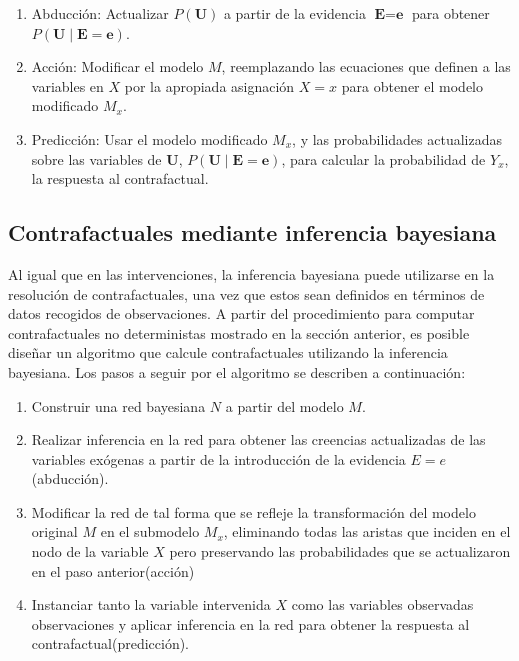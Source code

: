 \begin{enumerate}
	\item Abducción: Actualizar $P(\textbf{U})$ a partir de la evidencia $\textbf{E}=\textbf{e}$ para obtener $P(\textbf{U} \mid \textbf{E}=\textbf{e})$.
	
	\item Acción: Modificar el modelo $M$, reemplazando las ecuaciones que definen a las variables en $X$ por la apropiada asignación $X=x$ para obtener el modelo modificado $M_x$.
	
	\item Predicción: Usar el modelo modificado $M_x$, y las probabilidades actualizadas sobre las variables de $\textbf{U}$, $P(\textbf{U} \mid \textbf{E}=\textbf{e})$, para calcular la probabilidad de $Y_x$, la respuesta al contrafactual.
\end{enumerate}

\subsection{Contrafactuales mediante inferencia bayesiana}
Al igual que en las intervenciones, la inferencia bayesiana puede utilizarse en la resolución de contrafactuales, una vez que estos sean definidos en términos de datos recogidos de observaciones. A partir del procedimiento para computar contrafactuales no deterministas mostrado en la sección anterior, es posible diseñar un algoritmo que calcule contrafactuales utilizando la inferencia bayesiana. Los pasos a seguir por el algoritmo se describen a continuación:

\begin{enumerate}
	\item Construir una red bayesiana $N$ a partir del modelo $M$.
	\item Realizar inferencia en la red para obtener las creencias actualizadas de las variables exógenas a partir de la introducción de la evidencia $E=e$(abducción).
	\item Modificar la red de tal forma que se refleje la transformación del modelo original $M$ en el submodelo $M_x$, eliminando todas las aristas que inciden en el nodo de la variable $X$ pero preservando las probabilidades que se actualizaron en el paso anterior(acción)
	\item Instanciar tanto la variable intervenida $X$ como las variables observadas observaciones y aplicar inferencia en la red para obtener la respuesta al contrafactual(predicción).				
\end{enumerate}

